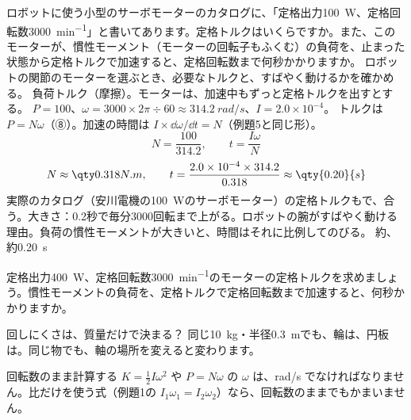 \begin{phreidai}[サーボモーターのトルク]
\label{ph:力-6:ex15}ロボットに使う小型のサーボモーターのカタログに、「定格出力\qty{100}{W}、定格回転数\qty{3000}{min^{-1}}」と書いてあります。定格トルクはいくらですか。また、このモーターが、慣性モーメント（モーターの回転子もふくむ）の負荷を、止まった状態から定格トルクで加速すると、定格回転数まで何秒かかりますか。
\phbamen
ロボットの関節のモーターを選ぶとき、必要なトルクと、すばやく動けるかを確かめる。
\phmushi
負荷トルク（摩擦）。モーターは、加速中もずっと定格トルクを出すとする。
\phzu
$P=100$、$\omega=3000\times2\pi\div60\approx\qty{314.2}{rad/s}$、$I=2.0\times10^{-4}$。
\phriyu
トルクは $P=N\omega$（⑧）。加速の時間は $I\times\dd\omega/\dd t=N$（例題5と同じ形）。
\phtateru
\[ N=\frac{100}{314.2},\qquad t=\frac{I\omega}{N} \]
\phtoku
\[ N\approx\pxgNm{0.318},\qquad t=\frac{2.0\times10^{-4}\times314.2}{0.318}\approx\qty{0.20}{s} \]
\phtashikame
実際のカタログ（安川電機の\qty{100}{W}のサーボモーター）の定格トルクもで、合う。\quad 大きさ：0.2秒で毎分3000回転まで上がる。ロボットの腕がすばやく動ける理由。負荷の慣性モーメントが大きいと、時間はそれに比例してのびる。
\kotae 約、約\qty{0.20}{s}
\end{phreidai}
\begin{jibun}
定格出力\qty{400}{W}、定格回転数\qty{3000}{min^{-1}}のモーターの定格トルクを求めましょう。慣性モーメントの負荷を、定格トルクで定格回転数まで加速すると、何秒かかりますか。
\end{jibun}


\begin{tsumazuki}{回しにくさは、質量だけで決まる？}
同じ\qty{10}{kg}・半径\qty{0.3}{m}でも、輪は、円板は。同じ物でも、軸の場所を変えると変わります。
\end{tsumazuki}

\begin{tsumazuki}{回転数のまま計算する}
$K=\tfrac{1}{2}I\omega^2$ や $P=N\omega$ の $\omega$ は、rad/s でなければなりません。比だけを使う式（例題1の $I_1\omega_1=I_2\omega_2$）なら、回転数のままでもかまいません。
\end{tsumazuki}

